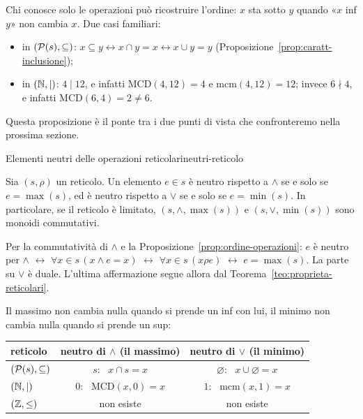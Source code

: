 \begin{spiegazione}
    Chi conosce solo le operazioni può ricostruire l'ordine: $x$ sta sotto $y$ quando «$x$ inf $y$» non cambia $x$. Due casi familiari:
    \begin{itemize}
        \item in $(\mathcal{P}(s), \subseteq)$: $x \subseteq y \leftrightarrow x \cap y = x \leftrightarrow x \cup y = y$ (Proposizione~\ref{prop:caratt-inclusione});
        \item in $(\mathbb{N}, \mid)$: $4 \mid 12$, e infatti $\mathrm{MCD}(4, 12) = 4$ e $\mathrm{mcm}(4, 12) = 12$; invece $6 \nmid 4$, e infatti $\mathrm{MCD}(6, 4) = 2 \neq 6$.
    \end{itemize}
    Questa proposizione è il ponte tra i due punti di vista che confronteremo nella prossima sezione.
\end{spiegazione}

\begin{concetto}
\begin{Proposizione}{Elementi neutri delle operazioni reticolari}{neutri-reticolo}
    \begin{prerequisiti}
    \end{prerequisiti}
    Sia $(s, \rho)$ un reticolo. Un elemento $e \in s$ è neutro rispetto a $\wedge$ se e solo se $e = \max(s)$, ed è neutro rispetto a $\vee$ se e solo se
    $e = \min(s)$. In particolare, se il reticolo è limitato, $(s, \wedge, \max(s))$ e $(s, \vee, \min(s))$ sono monoidi commutativi.
\end{Proposizione}
\begin{dimostrazione}
    Per la commutatività di $\wedge$ e la Proposizione~\ref{prop:ordine-operazioni}: $e$ è neutro per $\wedge$ $\leftrightarrow$ $\forall x \in s\,(x \wedge e = x)$ $\leftrightarrow$
    $\forall x \in s\,(x \rho e)$ $\leftrightarrow$ $e = \max(s)$. La parte su $\vee$ è duale. L'ultima affermazione segue allora dal Teorema~\ref{teo:proprieta-reticolari}.
\end{dimostrazione}
\end{concetto}

\begin{spiegazione}
    Il massimo non cambia nulla quando si prende un inf con lui, il minimo non cambia nulla quando si prende un sup:
    \begin{center}
    \renewcommand{\arraystretch}{1.25}
    \begin{tabular}{l|c|c}
        reticolo & neutro di $\wedge$ (il massimo) & neutro di $\vee$ (il minimo) \\ \hline
        $(\mathcal{P}(s), \subseteq)$ & $s$: \ $x \cap s = x$ & $\varnothing$: \ $x \cup \varnothing = x$ \\
        $(\mathbb{N}, \mid)$ & $0$: \ $\mathrm{MCD}(x, 0) = x$ & $1$: \ $\mathrm{mcm}(x, 1) = x$ \\
        $(\mathbb{Z}, \leq)$ & non esiste & non esiste \\
    \end{tabular}
    \end{center}
\end{spiegazione}

